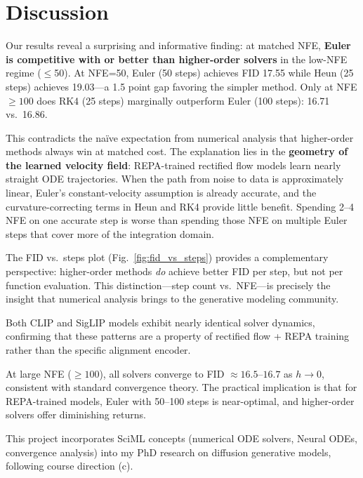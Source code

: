 \documentclass[10pt,twocolumn]{article}
\begin{document}
\section{Discussion}

Our results reveal a surprising and informative finding: at matched NFE, \textbf{Euler is competitive with or better than higher-order solvers} in the low-NFE regime ($\leq$50). At NFE=50, Euler (50 steps) achieves FID 17.55 while Heun (25 steps) achieves 19.03---a 1.5 point gap favoring the simpler method. Only at NFE${\geq}100$ does RK4 (25 steps) marginally outperform Euler (100 steps): 16.71 vs.\ 16.86.

This contradicts the na\"ive expectation from numerical analysis that higher-order methods always win at matched cost. The explanation lies in the \textbf{geometry of the learned velocity field}: REPA-trained rectified flow models learn nearly straight ODE trajectories. When the path from noise to data is approximately linear, Euler's constant-velocity assumption is already accurate, and the curvature-correcting terms in Heun and RK4 provide little benefit. Spending 2--4 NFE on one accurate step is worse than spending those NFE on multiple Euler steps that cover more of the integration domain.

The FID vs.\ steps plot (Fig.~\ref{fig:fid_vs_steps}) provides a complementary perspective: higher-order methods \emph{do} achieve better FID per step, but not per function evaluation. This distinction---step count vs.\ NFE---is precisely the insight that numerical analysis brings to the generative modeling community.

Both CLIP and SigLIP models exhibit nearly identical solver dynamics, confirming that these patterns are a property of rectified flow + REPA training rather than the specific alignment encoder.

At large NFE (${\geq}100$), all solvers converge to FID ${\approx}16.5$--$16.7$ as $h \to 0$, consistent with standard convergence theory. The practical implication is that for REPA-trained models, Euler with 50--100 steps is near-optimal, and higher-order solvers offer diminishing returns.

This project incorporates SciML concepts (numerical ODE solvers, Neural ODEs, convergence analysis) into my PhD research on diffusion generative models, following course direction (c).
\end{document}
